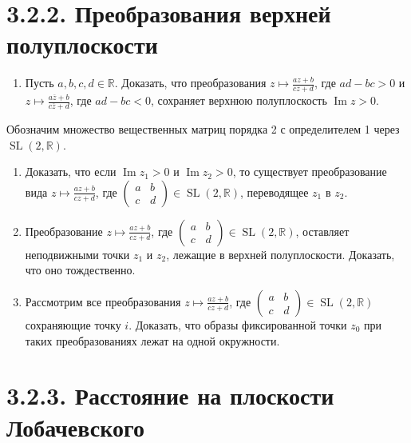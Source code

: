 	\section{3.2.2. Преобразования верхней полуплоскости}
	\begin{enumerate}[resume*]
		\item Пусть $a, b, c, d \in \mathbb{R}$. Доказать, что преобразования $z \mapsto \frac{az + b}{cz + d}$, где $ad - bc > 0$ и $z \mapsto \frac{a\overline z + b}{c\overline z + d}$, где $ad - bc < 0$, сохраняет верхнюю полуплоскость $\operatorname{Im} z > 0$.
	\end{enumerate}
	Обозначим множество вещественных матриц порядка 2 с определителем 1 через $\operatorname{SL}(2, \mathbb{R})$.
	\begin{enumerate}[resume*]
		\item Доказать, что если $\operatorname{Im} z_1 > 0$ и $\operatorname{Im} z_2 > 0$, то существует преобразование вида $z \mapsto \frac{az + b}{cz + d}$, где $\begin{pmatrix} a & b \\ c & d \end{pmatrix} \in \operatorname{SL}(2, \mathbb{R})$, переводящее $z_1$ в $z_2$.

		\item Преобразование $z \mapsto \frac{az + b}{cz + d}$, где $\begin{pmatrix} a & b \\ c & d \end{pmatrix} \in \operatorname{SL}(2, \mathbb{R})$, оставляет неподвижными точки $z_1$ и $z_2$, лежащие в верхней полуплоскости. Доказать, что оно тождественно.

		\item Рассмотрим все преобразования $z \mapsto \frac{az + b}{cz + d}$, где $\begin{pmatrix} a & b \\ c & d \end{pmatrix} \in \operatorname{SL}(2, \mathbb{R})$ сохраняющие точку $i$. Доказать, что образы фиксированной точки $z_0$ при таких преобразованиях лежат на одной окружности.
	\end{enumerate}
	\section{3.2.3. Расстояние на плоскости Лобачевского}

